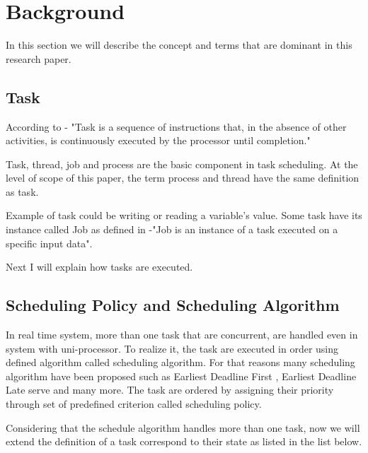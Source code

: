 


\section{Background}
In this section we will describe the concept and terms that are dominant in this research paper.

\subsection{Task}

According to \cite{b4}- "Task is a sequence of instructions that, in the absence of other activities, is continuously executed by the processor until completion."

Task, thread, job and process  are the basic component in task scheduling. At the level of scope of this paper, the term process and thread have the same definition as task. 

Example of task could be writing or reading a variable's value. Some task have its instance called Job as defined in \cite{b4}-"Job is an instance of a task executed on a specific input data". 

Next I will explain how tasks are executed.


\subsection{Scheduling Policy and Scheduling Algorithm }


In real time system, more than one task that are concurrent, are handled even in system with uni-processor. To realize it,  the task are executed in order using defined algorithm called scheduling algorithm. For that reasons many scheduling algorithm have been proposed such as Earliest Deadline First , Earliest Deadline Late serve and many more. The task are ordered by assigning their priority through set of predefined criterion called scheduling policy.

Considering that the schedule algorithm handles more than one task, now we will extend the definition of a task correspond to their state as listed in the list below.

